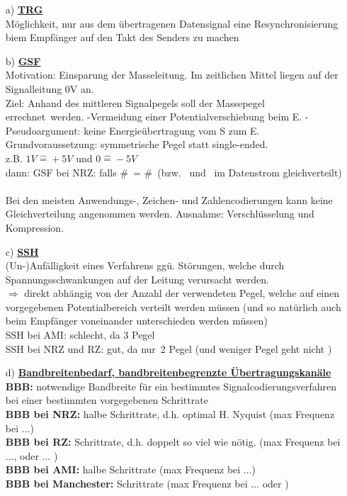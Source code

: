 \documentclass[10pt,a4paper]{scrartcl}
\begin{document}
\begin{enumerate}
	\item[a)] \textbf{\underline{\ac{TRG}}}\\[0.5em]
	Möglichkeit, nur aus dem übertragenen Datensignal eine Resynchronisierung biem Empfänger auf den Takt des Senders zu machen
	
	\item[b)]\textbf{\underline{ \ac{GSF}}} \\[0.5em]
	Motivation: Einsparung der Masseleitung. Im zeitlichen Mittel liegen auf der Signalleitung 0V an.\\
	Ziel: Anhand des mittleren Signalpegels soll der Massepegel \glqq errechnet\grqq\ werden.
	\subitem -Vermeidung einer Potentialverschiebung beim E.
	\subitem -Pseudoargument: keine Energieübertragung vom S zum E.\\
	Grundvoraussetzung: symmetrische Pegel statt single-ended. \\
	z.B. $1V \hat{=} +5V$ und $0 \hat{=} -5V$\\
	dann: \ac{GSF} bei \ac{NRZ}: falls \#\grqq\ = \#\grqq\ (bzw. \grqq\ und \grqq\ im Datenstrom gleichverteilt)\\\\
	Bei den meisten Anwendungs-, Zeichen- und Zahlencodierungen kann keine Gleichverteilung angenommen werden. Ausnahme: Verschlüsselung und Kompression.
	\item[c)] \textbf{\underline{\ac{SSH}}}\\[0.5em]
	(Un-)Anfälligkeit eines Verfahrens ggü. Störungen, welche durch Spannungsschwankungen auf der Leitung verursacht werden.\\
	$\Rightarrow$ direkt abhängig von der Anzahl der verwendeten Pegel, welche auf einen vorgegebenen Potentialbereich verteilt werden müssen (und so natürlich auch beim Empfänger voneinander unterschieden werden müssen)\\
	\ac{SSH} bei \ac{AMI}: schlecht, da 3 Pegel\\
	\ac{SSH} bei \ac{NRZ} und \ac{RZ}: gut, da \glqq nur\grqq\ 2 Pegel (und weniger Pegel geht nicht \smiley{})
	
	\item[d)] \textbf{\underline{Bandbreitenbedarf, bandbreitenbegrenzte Übertragungskanäle}}\\[0.5em]
	\noindent
	\textbf{\ac{BBB}: }notwendige Bandbreite für ein bestimmtes Signalcodierungsverfahren bei einer bestimmten vorgegebenen Schrittrate\\
	\textbf{\ac{BBB} bei \acl{NRZ}:} halbe Schrittrate, d.h. optimal H. Nyquist (max Frequenz bei ...\grqq)\\
	\textbf{\ac{BBB} bei \acl{RZ}:} Schrittrate, d.h. doppelt so viel wie nötig. (max Frequenz bei ...\grqq, oder ...\grqq{} )\\
	\textbf{\ac{BBB} bei \acl{AMI}:} halbe Schrittrate (max Frequenz bei ...\grqq)\\
	\textbf{\ac{BBB} bei Manchester:} Schrittrate (max Frequenz bei ...\grqq{} oder \grqq)\\
\end{enumerate}
\end{document}
